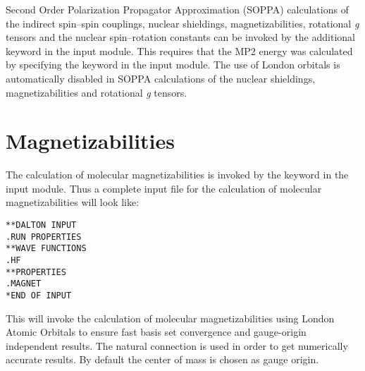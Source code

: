 Second Order Polarization Propagator Approximation (SOPPA)  
 calculations 
\cite{esnpjjodjcp73,jopjdycpr2,mjpekdtehjajjojcp,spascpl260,tejospastcan100} 
of the indirect spin--spin couplings, nuclear shieldings, magnetizabilities, 
rotational {\em g} tensors and the nuclear spin--rotation constants can
be invoked by the additional keyword  in the  
input module. This requires that the MP2 energy was calculated by specifying 
the keyword  in the  input module. The use of 
London orbitals is automatically disabled in SOPPA calculations of the nuclear
shieldings, magnetizabilities and rotational {\em g} tensors.

\section{Magnetizabilities}\label{sec:magnetizability}

\begin{center}
\end{center}

The calculation of molecular magnetizabilities
is invoked by the
keyword  in the  input module. Thus
a complete input file for the calculation of molecular
magnetizabilities will look like:

\begin{verbatim}
**DALTON INPUT
.RUN PROPERTIES
**WAVE FUNCTIONS
.HF
**PROPERTIES
.MAGNET
*END OF INPUT
\end{verbatim}

This will invoke the calculation of molecular magnetizabilities using
London Atomic Orbitals to ensure fast basis set
convergence and
gauge-origin independent results. The natural
connection
\cite{joklbkrthpjtca90} is used in order to get numerically accurate
results. By default the center of mass is chosen
as gauge origin.

